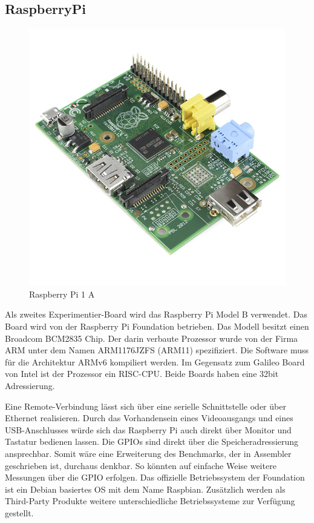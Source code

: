 \subsection{RaspberryPi}


\begin{figure}
\centering
\includegraphics[scale=0.4]{images/raspberry-pi-2.png}
\caption{Raspberry Pi 1 A\cite{raspberry_image}}
\label{fig:Raspberry Pi 1 A}
\end{figure}


Als zweites Experimentier-Board wird das Raspberry Pi Model B\cite{raspberry_foundation} verwendet. Das Board wird von der Raspberry Pi Foundation betrieben. Das Modell besitzt einen Broadcom BCM2835\cite{broadcom_datasheet} Chip. Der darin verbaute Prozessor wurde von der Firma ARM unter dem Namen ARM1176JZFS\cite{arm_datasheet} (ARM11) spezifiziert. Die Software muss für die Architektur ARMv6 kompiliert werden. Im Gegensatz zum Galileo Board von Intel ist der Prozessor ein RISC-CPU. Beide Boards haben eine 32bit Adressierung.
\par
Eine Remote-Verbindung lässt sich über eine serielle Schnittstelle oder über Ethernet realisieren. Durch das Vorhandensein eines Videoausgangs und eines USB-Anschlusses würde sich das Raspberry Pi auch direkt über Monitor und Tastatur bedienen lassen. Die GPIOs sind direkt über die Speicheradressierung ansprechbar. Somit wäre eine Erweiterung des Benchmarks, der in Assembler geschrieben ist, durchaus denkbar. So könnten auf einfache Weise weitere Messungen über die GPIO erfolgen. Das offizielle Betriebssystem der Foundation ist ein Debian basiertes OS mit dem Name Raspbian. Zusätzlich werden als Third-Party Produkte weitere unterschiedliche Betriebssysteme zur Verfügung gestellt. 











